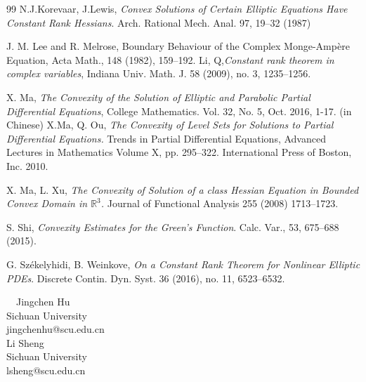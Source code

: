 \documentclass{article}
\numberwithin{equation}{section}
\newcommand{\ER}{\mathbb{R}}
\begin{document}
\begin{thebibliography}{99}
 N.J.Korevaar, J.Lewis, {\em Convex 
	Solutions of Certain Elliptic Equations Have Constant Rank Hessians}. Arch. Rational Mech. Anal. 97, 19–32 (1987)



 
 J. M. Lee and R. Melrose, Boundary Behaviour of the Complex Monge-Amp\`ere Equation, Acta Math., 148 (1982), 159–192.
  Li, Q,{\em Constant rank theorem in complex variables}, Indiana Univ. Math. J. 58 (2009),
 no. 3, 1235–1256.
 
 

    X. Ma, {\em The Convexity of the Solution of Elliptic and Parabolic Partial Differential Equations}, College Mathematics. Vol. 32, No. 5, Oct. 2016, 1-17. (in Chinese)
   X.Ma, Q. Ou, {\em The Convexity of Level Sets for Solutions
   	to Partial Differential Equations.} Trends in
   Partial Differential Equations,
   Advanced Lectures in Mathematics
   Volume X, pp. 295–322. International Press of Boston, Inc. 2010.

 X. Ma, L. Xu, {\em The Convexity of Solution of a class Hessian Equation	in Bounded Convex Domain in $\ER^3$.} Journal of Functional Analysis 255 (2008) 1713–1723.
   
   S. Shi, {\em Convexity Estimates for the Green’s Function}. Calc. Var., 53, 675–688 (2015).


    G. Sz\'ekelyhidi, B. Weinkove,  {\em On a Constant Rank Theorem for Nonlinear Elliptic PDEs}. Discrete Contin. Dyn. Syst. { 36} (2016), no. 11, 6523--6532.
   

\end{thebibliography}
\ \ Jingchen Hu\\
Sichuan University\\jingchenhu@scu.edu.cn\\

Li Sheng\\
Sichuan University\\ lsheng@scu.edu.cn
\end{document}
